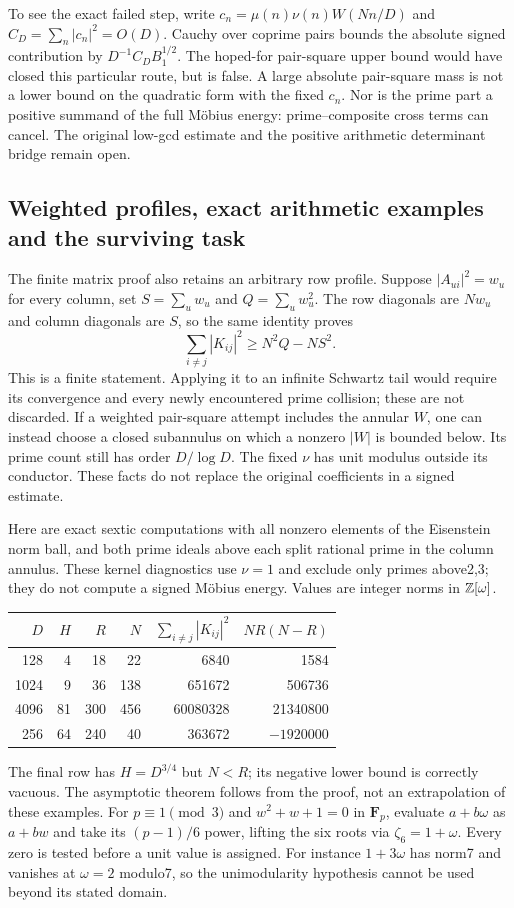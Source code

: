 To see the exact failed step, write $c_n=\mu(n)\nu(n)W(Nn/D)$ and
$C_D=\sum_n|c_n|^2=O(D)$. Cauchy over coprime pairs bounds the absolute
signed contribution by $D^{-1}C_DB_1^{1/2}$. The hoped-for pair-square
upper bound would have closed this particular route, but is false.
A large absolute pair-square mass is not a lower bound on the quadratic
form with the fixed $c_n$. Nor is the prime part a positive summand of the
full M\"obius energy: prime--composite cross terms can cancel. The original
low-gcd estimate and the positive arithmetic determinant bridge remain open.

\subsection{Weighted profiles, exact arithmetic examples and the surviving task}
The finite matrix proof also retains an arbitrary row profile. Suppose
$|A_{ui}|^2=w_u$ for every column, set $S=\sum_u w_u$ and
$Q=\sum_u w_u^2$. The row diagonals are $Nw_u$ and column diagonals are
$S$, so the same identity proves
\[
 \sum_{i\ne j}|K_{ij}|^2\ge N^2Q-NS^2.
\]
This is a finite statement. Applying it to an infinite Schwartz tail would
require its convergence and every newly encountered prime collision;
these are not discarded. If a weighted pair-square attempt includes the
annular $W$, one can instead choose a closed subannulus on which a nonzero
$|W|$ is bounded below. Its prime count still has order $D/\log D$.
The fixed $\nu$ has unit modulus outside its conductor. These facts do not
replace the original coefficients in a signed estimate.

Here are exact sextic computations with all nonzero elements of the
Eisenstein norm ball, and both prime ideals above each split rational prime
in the column annulus. These kernel diagnostics use $\nu=1$ and exclude
only primes above2,3; they do not compute a signed M\"obius energy.
Values are integer norms in $\mathbb Z[\omega]$.
\begin{center}\small
\begin{tabular}{rrrrrr}
$D$&$H$&$R$&$N$&$\sum_{i\ne j}|K_{ij}|^2$&$NR(N-R)$\\\hline
128&4&18&22&6840&1584\\
1024&9&36&138&651672&506736\\
4096&81&300&456&60080328&21340800\\
256&64&240&40&363672&$-1920000$
\end{tabular}
\end{center}
The final row has $H=D^{3/4}$ but $N<R$; its negative lower bound is
correctly vacuous. The asymptotic theorem follows from the proof, not an
extrapolation of these examples. For $p\equiv1\pmod3$ and
$w^2+w+1=0$ in $\mathbf F_p$, evaluate $a+b\omega$ as $a+bw$ and take
its $(p-1)/6$ power, lifting the six roots via $\zeta_6=1+\omega$.
Every zero is tested before a unit value is assigned. For instance
$1+3\omega$ has norm7 and vanishes at $\omega=2$ modulo7, so the
unimodularity hypothesis cannot be used beyond its stated domain.


